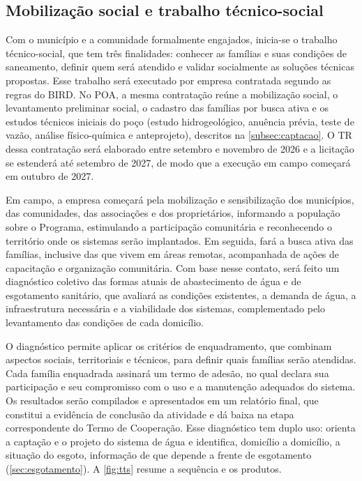 \subsection{Mobilização social e trabalho técnico-social}
\label{subsec:tts}

Com o município e a comunidade formalmente engajados, inicia-se o trabalho
técnico-social, que tem três finalidades: conhecer as famílias e suas
condições de saneamento, definir quem será atendido e validar socialmente as
soluções técnicas propostas. Esse trabalho será executado por empresa
contratada segundo as regras do BIRD. No POA, a mesma contratação reúne a
mobilização social, o levantamento preliminar social, o cadastro das famílias
por busca ativa e os estudos técnicos iniciais do poço (estudo
hidrogeológico, anuência prévia, teste de vazão, análise físico-química e
anteprojeto), descritos na \autoref{subsec:captacao}. O TR dessa
contratação será elaborado entre setembro e novembro de 2026 e a licitação
se estenderá até setembro de 2027, de modo que a execução em campo começará
em outubro de 2027.

Em campo, a empresa começará pela mobilização e sensibilização dos
municípios, das comunidades, das associações e dos proprietários, informando
a população sobre o Programa, estimulando a participação comunitária e
reconhecendo o território onde os sistemas serão implantados. Em seguida,
fará a busca ativa das famílias, inclusive das que vivem em áreas remotas,
acompanhada de ações de capacitação e organização comunitária. Com base
nesse contato, será feito um diagnóstico coletivo das formas atuais de
abastecimento de água e de esgotamento sanitário, que avaliará as condições
existentes, a demanda de água, a infraestrutura necessária e a viabilidade
dos sistemas, complementado pelo levantamento das condições de cada
domicílio.

O diagnóstico permite aplicar os critérios de enquadramento, que combinam
aspectos sociais, territoriais e técnicos, para definir quais famílias serão
atendidas. Cada família enquadrada assinará um termo de adesão, no qual
declara sua participação e seu compromisso com o uso e a manutenção
adequados do sistema. Os resultados serão compilados e apresentados em um
relatório final, que constitui a evidência de conclusão da atividade e dá
baixa na etapa correspondente do Termo de Cooperação. Esse diagnóstico tem
duplo uso: orienta a captação e o projeto do sistema de água e identifica,
domicílio a domicílio, a situação do esgoto, informação de que depende a
frente de esgotamento (\autoref{sec:esgotamento}). A
\autoref{fig:tts} resume a sequência e os produtos.

